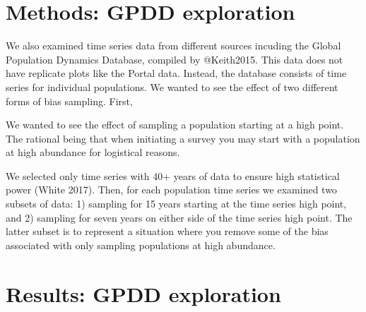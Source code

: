 \documentclass[]{article}
\begin{document}
\pagebreak

\section{Methods: GPDD exploration}

We also examined time series data from different sources incuding the
Global Population Dynamics Database, compiled by @Keith2015. This data
does not have replicate plots like the Portal data. Instead, the
database consists of time series for individual populations. We wanted
to see the effect of two different forms of bias sampling. First,

We wanted to see the effect of sampling a population starting at a high
point. The rational being that when initiating a survey you may start
with a population at high abundance for logistical reasons.

We selected only time series with 40+ years of data to ensure high
statistical power (White 2017). Then, for each population time series we
examined two subsets of data: 1) sampling for 15 years starting at the
time series high point, and 2) sampling for seven years on either side
of the time series high point. The latter subset is to represent a
situation where you remove some of the bias associated with only
sampling populations at high abundance.

\section{Results: GPDD exploration}
\end{document}
